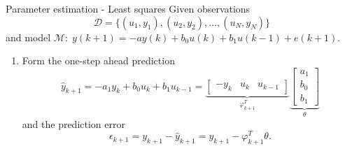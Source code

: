 \documentclass[presentation,aspectratio=169]{beamer}
\begin{document}
\begin{frame}[label={sec:org75d4189}]{Parameter estimation - Least squares}
Given observations \[\mathcal{D} = \{ (u_1,y_1), (u_2, y_2), \ldots, (u_N, y_N)\}\] and model \(\mathcal{M}: \; y(k+1) = -ay(k) + b_0u(k) + b_1u(k-1)  + e(k+1)\).

\begin{enumerate}
\item Form the one-step ahead prediction
\[ \hat{y}_{k+1} = -a_1y_k + b_0u_k + b_1u_{k-1} =  \underbrace{\begin{bmatrix} -y_k & u_k & u_{k-1} \end{bmatrix}}_{\varphi_{k+1}^T} \underbrace{\begin{bmatrix} a_1\\b_0\\b_1\end{bmatrix}}_{\theta}\] and the prediction error
   \[ \epsilon_{k+1} = y_{k+1} - \hat{y}_{k+1} = y_{k+1} - \varphi_{k+1}^T\theta.\]
\end{enumerate}
\end{frame}
\end{document}
